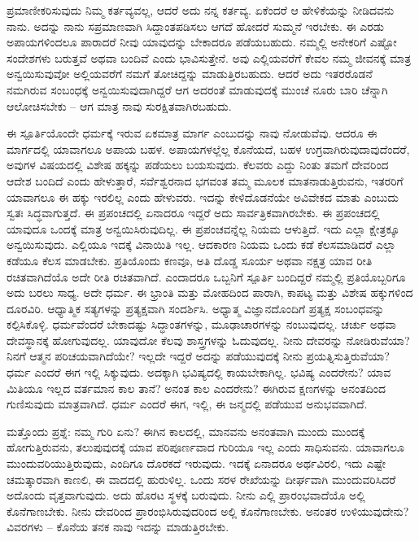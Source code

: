 ಪ್ರಮಾಣೀಕರಿಸುವುದು ನಿಮ್ಮ ಕರ್ತವ್ಯವಲ್ಲ, ಆದರೆ ಅದು ನನ್ನ ಕರ್ತವ್ಯ. ಏಕೆಂದರೆ ಆ ಹೇಳಿಕೆಯನ್ನು ನೀಡಿದವನು ನಾನು. ಅದನ್ನು ನಾನು ಸಪ್ರಮಾಣವಾಗಿ ಸಿದ್ದಾಂತಪಡಿಸಲು ಆಗದೆ ಹೋದರೆ ಸುಮ್ಮನೆ ಇರಬೇಕು. ಈ ಎರಡು ಅಪಾಯಗಳಿಂದಲೂ ಪಾರಾದರೆ ನೀವು ಯಾವುದನ್ನು ಬೇಕಾದರೂ ಪಡೆಯಬಹುದು. ನಮ್ಮಲ್ಲಿ ಅನೇಕರಿಗೆ ಎಷ್ಟೋ ಸಂದೇಶಗಳು ಬರುತ್ತವೆ ಅಥವಾ ಬಂದಿವೆ ಎಂದು ಭಾವಿಸುತ್ತೇನೆ. ಅವು ಎಲ್ಲಿಯವರೆಗೆ ಕೇವಲ ನಮ್ಮ ಜೀವನಕ್ಕೆ ಮಾತ್ರ ಅನ್ವಯಿಸುವುವೋ ಅಲ್ಲಿಯವರೆಗೆ ನಮಗೆ ತೋಚಿದ್ದನ್ನು ಮಾಡುತ್ತಿರಬಹುದು. ಆದರೆ ಅದು ಇತರರೊಡನೆ ನಮಗಿರುವ ಸಂಬಂಧಕ್ಕೆ ಅನ್ವಯಿಸುವುದಾಗಿದ್ದರೆ ಆಗ ಅದರಂತೆ ಮಾಡುವುದಕ್ಕೆ ಮುಂಚೆ ನೂರು ಬಾರಿ ಚೆನ್ನಾಗಿ ಆಲೋಚಿಸಬೇಕು – ಆಗ ಮಾತ್ರ ನಾವು ಸುರಕ್ಷಿತವಾಗಿರಬಹುದು.

ಈ ಸ್ಪೂರ್ತಿಯೊಂದೇ ಧರ್ಮಕ್ಕೆ ಇರುವ ಏಕಮಾತ್ರ ಮಾರ್ಗ ಎಂಬುದನ್ನು ನಾವು ನೋಡುವೆವು. ಆದರೂ ಈ ಮಾರ್ಗದಲ್ಲಿ ಯಾವಾಗಲೂ ಅಪಾಯ ಬಹಳ. ಅಪಾಯಗಳಲ್ಲೆಲ್ಲ ಕೊನೆಯದೆ, ಬಹಳ ಉಗ್ರವಾಗಿರುವುದಾವುದೆಂದರೆ, ಅವುಗಳ ವಿಷಯದಲ್ಲಿ ವಿಶೇಷ ಹಕ್ಕನ್ನು ಪಡೆಯಲು ಬಯಸುವುದು. ಕೆಲವರು ಎದ್ದು ನಿಂತು ತಮಗೆ ದೇವರಿಂದ ಆದೇಶ ಬಂದಿದೆ ಎಂದು ಹೇಳುತ್ತಾರೆ, ಸರ್ವೆಶ್ವರನಾದ ಭಗವಂತ ತಮ್ಮ ಮೂಲಕ ಮಾತನಾಡುತ್ತಿರುವನು, ಇತರರಿಗೆ ಯಾವಾಗಲೂ ಈ ಹಕ್ಕು ಇರಲಿಲ್ಲ ಎಂದು ಹೇಳುವರು. ಇದನ್ನು ಕೇಳಿದೊಡನೆಯೇ ಅವಿವೇಕದ ಮಾತು ಎಂಬುದು ಸ್ವತಃ ಸಿದ್ಧವಾಗುತ್ತದೆ. ಈ ಪ್ರಪಂಚದಲ್ಲಿ ಏನಾದರೂ ಇದ್ದರೆ ಅದು ಸಾರ್ವತ್ರಿಕವಾಗಿರಬೇಕು. ಈ ಪ್ರಪಂಚದಲ್ಲಿ ಯಾವುದೂ ಒಂದಕ್ಕೆ ಮಾತ್ರ ಅನ್ವಯಿಸಿರುವುದಿಲ್ಲ. ಈ ಪ್ರಪಂಚವನ್ನೆಲ್ಲ ನಿಯಮ ಆಳುತ್ತಿದೆ. ಇದು ಎಲ್ಲಾ ಕ್ಷೇತ್ರಕ್ಕೂ ಅನ್ವಯಿಸುವುದು. ಎಲ್ಲಿಯೂ ಇದಕ್ಕೆ ವಿನಾಯಿತಿ ಇಲ್ಲ. ಆದಕಾರಣ ನಿಯಮ ಒಂದು ಕಡೆ ಕೆಲಸಮಾಡಿದರೆ ಎಲ್ಲಾ ಕಡೆಯೂ ಕೆಲಸ ಮಾಡಬೇಕು. ಪ್ರತಿಯೊಂದು ಕಣವೂ, ಅತಿ ದೊಡ್ಡ ಸೂರ್ಯ ಅಥವಾ ನಕ್ಷತ್ರ ಯಾವ ರೀತಿ ರಚಿತವಾಗಿದೆಯೊ ಅದೇ ರೀತಿ ರಚಿತವಾಗಿದೆ. ಎಂದಾದರೂ ಒಬ್ಬನಿಗೆ ಸ್ಪೂರ್ತಿ ಬಂದಿದ್ದರೆ ನಮ್ಮಲ್ಲಿ ಪ್ರತಿಯೊಬ್ಬರಿಗೂ ಅದು ಬರಲು ಸಾಧ್ಯ. ಅದೇ ಧರ್ಮ. ಈ ಭ್ರಾಂತಿ ಮತ್ತು ಮೋಹದಿಂದ ಪಾರಾಗಿ, ಕಾಪಟ್ಯ ಮತ್ತು ವಿಶೇಷ ಹಕ್ಕುಗಳಿಂದ ದೂರವಿರಿ. ಆಧ್ಯಾತ್ಮಿಕ ಸತ್ಯಗಳನ್ನು ಪ್ರತ್ಯಕ್ಷವಾಗಿ ಸಂದರ್ಶಿಸಿ. ಅಧ್ಯಾತ್ಮ ವಿಜ್ಞಾನದೊಂದಿಗೆ ಪ್ರತ್ಯಕ್ಷ ಸಂಬಂಧವನ್ನು ಕಲ್ಪಿಸಿಕೊಳ್ಳಿ. ಧರ್ಮವೆಂದರೆ ಬೇಕಾದಷ್ಟು ಸಿದ್ಧಾಂತಗಳನ್ನು, ಮೂಢಾಚಾರಗಳನ್ನು ನಂಬುವುದಲ್ಲ. ಚರ್ಚು ಅಥವಾ ದೇವಸ್ಥಾನಕ್ಕೆ ಹೋಗುವುದಲ್ಲ. ಯಾವುದೋ ಕೆಲವು ಶಾಸ್ತ್ರಗಳನ್ನು ಓದುವುದಲ್ಲ. ನೀನು ದೇವರನ್ನು ನೋಡಿರುವೆಯಾ? ನಿನಗೆ ಆತ್ಮನ ಪರಿಚಯವಾಗಿದೆಯೇ? ಇಲ್ಲದೇ ಇದ್ದರೆ ಅದನ್ನು ಪಡೆಯುವುದಕ್ಕೆ ನೀನು ಪ್ರಯತ್ನಿಸುತ್ತಿರುವೆಯಾ? ಧರ್ಮ ಎಂದರೆ ಈಗ ಇಲ್ಲಿ ಸಿಕ್ಕುವುದು. ಅದಕ್ಕಾಗಿ ಭವಿಷ್ಯದಲ್ಲಿ ಕಾಯಬೇಕಾಗಿಲ್ಲ. ಭವಿಷ್ಯ ಎಂದರೇನು? ಯಾವ ಮಿತಿಯೂ ಇಲ್ಲದ ವರ್ತಮಾನ ಕಾಲ ತಾನೆ? ಅನಂತ ಕಾಲ ಎಂದರೇನು? ಈಗಿರುವ ಕ್ಷಣಗಳನ್ನು ಅನಂತದಿಂದ ಗುಣಿಸುವುದು ಮಾತ್ರವಾಗಿದೆ. ಧರ್ಮ ಎಂದರೆ ಈಗ, ಇಲ್ಲಿ, ಈ ಜನ್ಮದಲ್ಲಿ ಪಡೆಯುವ ಅನುಭವವಾಗಿದೆ.

ಮತ್ತೊಂದು ಪ್ರಶ್ನೆ: ನಮ್ಮ ಗುರಿ ಏನು? ಈಗಿನ ಕಾಲದಲ್ಲಿ, ಮಾನವನು ಅನಂತವಾಗಿ ಮುಂದು ಮುಂದಕ್ಕೆ ಹೋಗುತ್ತಿರುವನು, ತಲುಪುವುದಕ್ಕೆ ಯಾವ ಪರಿಪೂರ್ಣವಾದ ಗುರಿಯೂ ಇಲ್ಲ ಎಂದು ಸಾಧಿಸುವನು. ಯಾವಾಗಲೂ ಮುಂದುವರಿಯುತ್ತಿರುವುದು, ಎಂದಿಗೂ ದೊರಕದೆ ಇರುವುದು. ಇದಕ್ಕೆ ಏನಾದರೂ ಅರ್ಥವಿರಲಿ, ಇದು ಎಷ್ಟೇ ಚಮತ್ಕಾರವಾಗಿ ಕಾಣಲಿ, ಈ ವಾದದಲ್ಲಿ ಹುರುಳಿಲ್ಲ. ಒಂದು ಸರಳ ರೇಖೆಯನ್ನು ದೀರ್ಘವಾಗಿ ಮುಂದುವರಿಸಿದರೆ ಅದೊಂದು ವೃತ್ತವಾಗುವುದು. ಅದು ಹೊರಟ ಸ್ಥಳಕ್ಕೆ ಬರುವುದು. ನೀನು ಎಲ್ಲಿ ಪ್ರಾರಂಭವಾದೆಯೊ ಅಲ್ಲಿ ಕೊನೆಗಾಣಬೇಕು. ನೀನು ದೇವರಿಂದ ಪ್ರಾರಂಭಿಸಿರುವುದರಿಂದ ಅಲ್ಲಿ ಕೊನೆಗಾಣಬೇಕು. ಅನಂತರ ಉಳಿಯುವುದೇನು? ವಿವರಗಳು – ಕೊನೆಯ ತನಕ ನಾವು ಇದನ್ನು ಮಾಡುತ್ತಿರಬೇಕು.

